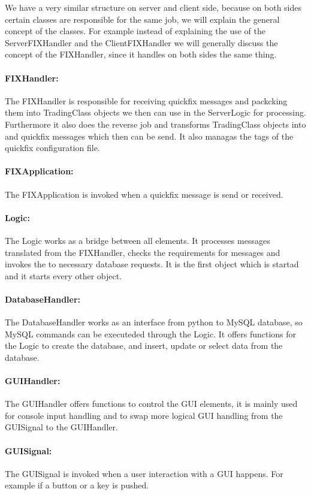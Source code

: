\documentclass[a4paper, 11pt]{article}
\begin{document}
We have a very similar structure on server and client side, because on both sides certain classes are responsible for the same job,
we will explain the general concept of the classes. For example instead of explaining the use of the ServerFIXHandler and the ClientFIXHandler
we will generally discuss the concept of the FIXHandler, since it handles on both sides the same thing.
\paragraph*{FIXHandler:} The FIXHandler is responsible for receiving quickfix messages and packcking them into TradingClass objects 
we then can use in the ServerLogic for processing. Furthermore it also does the reverse job and transforms TradingClass objects into
and quickfix messages which then can be send. It also managas the tags of the quickfix configuration file.
\paragraph*{FIXApplication:} The FIXApplication is invoked when a quickfix message is send or received.
\paragraph*{Logic:} The Logic works as a bridge between all elements. It processes messages translated from the FIXHandler, checks the 
requirements for messages and invokes the to necessary database requests. It is the first object which is startad and it starts every other object.
\paragraph*{DatabaseHandler:} The DatabaseHandler works as an interface from python to MySQL database, so MySQL commands can be executeded through
the Logic. It offers functions for the Logic to create the database, and insert, update or select data from the database.
\paragraph*{GUIHandler:} The GUIHandler offers functions to control the GUI elements, it is mainly used for console input handling and to swap more
logical GUI handling from the GUISignal to the GUIHandler.
\paragraph*{GUISignal:} The GUISignal is invoked when a user interaction with a GUI happens. For example if a button or a key is pushed.
\end{document}

